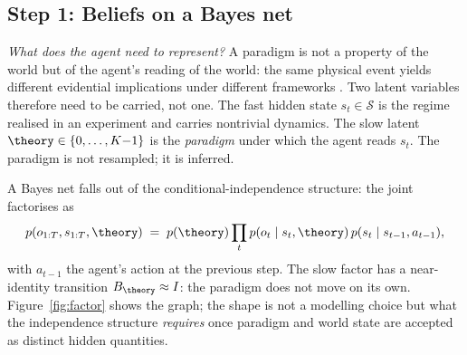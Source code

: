 \subsection{Step 1: Beliefs on a Bayes net}
\label{ssec:bayesnet}

\noindent\textit{What does the agent need to represent?} A paradigm
is not a property of the world but of the agent's reading of the
world: the same physical event yields different evidential
implications under different frameworks \citep{kuhn1962Structure}.
Two latent variables therefore need to be carried, not one. The fast
hidden state $s_t \in \mathcal S$ is the regime realised in an
experiment and carries nontrivial dynamics. The slow latent
$\theory \in \{0, \dots, K{-}1\}$ is the \emph{paradigm} under which
the agent reads $s_t$. The paradigm is not resampled; it is inferred.

A Bayes net falls out of the conditional-independence structure: the
joint factorises as
\begin{equation}
p(o_{1:T}, s_{1:T}, \theory)
\;=\;
p(\theory)\prod_{t} p(o_t \mid s_t, \theory)\,
   p(s_t \mid s_{t-1}, a_{t-1}),
\label{eq:gen}
\end{equation}
with $a_{t-1}$ the agent's action at the previous step. The slow
factor has a near-identity transition $B_\theory \approx I$: the
paradigm does not move on its own. Figure~\ref{fig:factor} shows the
graph; the shape is not a modelling choice but what the independence
structure \emph{requires} once paradigm and world state are accepted
as distinct hidden quantities.

